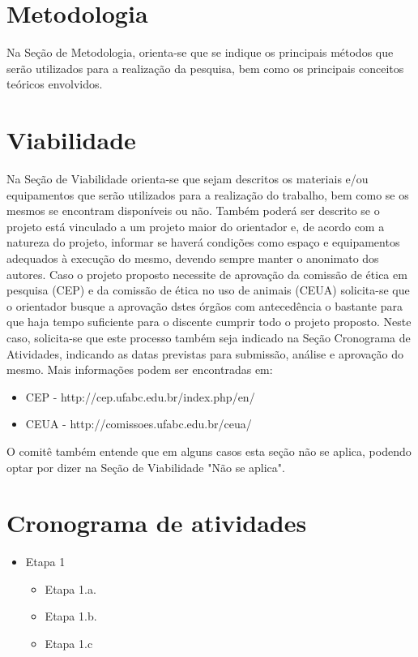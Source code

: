 \documentclass[a4paper,12pt]{article}
\begin{document}
{\begin{itemize}
\end{itemize}


\section{Metodologia}
Na Seção de Metodologia, orienta-se que se indique os principais métodos que serão utilizados para a realização da pesquisa, bem como os principais conceitos teóricos envolvidos.


\section{Viabilidade}
Na Seção de Viabilidade orienta-se que sejam descritos os materiais e/ou equipamentos que serão utilizados para a realização do trabalho, bem como se os mesmos se encontram disponíveis ou não.
Também poderá ser descrito se o projeto está vinculado a um projeto maior do orientador e, de acordo com a natureza do projeto, informar se haverá condições como espaço e equipamentos adequados à execução do mesmo, devendo sempre manter o anonimato dos autores.
Caso o projeto proposto necessite de aprovação da comissão de ética em pesquisa (CEP) e da comissão de ética no uso de animais (CEUA) solicita-se que o orientador busque a aprovação dstes órgãos com antecedência o bastante para que haja tempo suficiente para o discente cumprir todo o projeto proposto. Neste caso, solicita-se que este processo também seja indicado na Seção Cronograma de Atividades, indicando as datas previstas para submissão, análise e aprovação do mesmo. Mais informações podem ser encontradas em:\\ \cite{Griffiths:111880}

\begin{itemize}
    \item CEP - http://cep.ufabc.edu.br/index.php/en/
    \item CEUA - http://comissoes.ufabc.edu.br/ceua/
\end{itemize}

O comitê também entende que em alguns casos esta seção não se aplica, podendo optar por dizer na Seção de Viabilidade "Não se aplica".


\section{Cronograma de atividades}
\begin{itemize}
    \item Etapa 1
    \begin{itemize}
        \item Etapa 1.a.
        \item Etapa 1.b.
        \item Etapa 1.c
    \end{itemize}
        

\end{itemize}}
\end{document}

